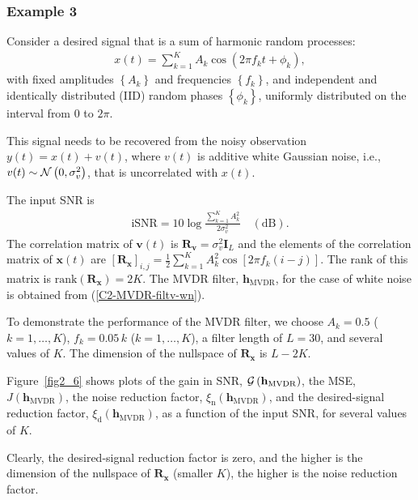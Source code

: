 \documentclass[10pt,pdflatex,headrule,landscape]{beamer}
\begin{document}
\begin{frame}
    \frametitle{Example 3}
Consider a desired signal that is a sum of harmonic random processes:
\begin{eqnarray*}
x(t) = \sum_{k=1}^K A_k \cos\left( 2\pi f_k t+\phi_k \right) ,
\end{eqnarray*}
with fixed amplitudes $\left\{A_k\right\}$ and frequencies $\left\{f_k\right\}$, and independent and identically distributed (IID) random phases $\left\{\phi_k\right\}$, uniformly distributed on the interval from $0$ to $2\pi$.

This signal needs to be recovered from the noisy observation $y(t)=x(t)+v(t)$, where $v(t)$ is additive white Gaussian noise, i.e., $v(t)\sim {\cal N}\left(0,\sigma_v^2\right)$, that is uncorrelated with $x(t)$.

\end{frame}
\begin{frame}[allowframebreaks]

The input SNR is
\begin{eqnarray*}
\mathrm{iSNR} = 10\log\frac{\sum_{k=1}^K A_k^2}{2 \sigma_v^2} \quad \mathrm{(dB)} .
\end{eqnarray*}
The correlation matrix of $\mathbf{v}(t)$ is $\mathbf{R}_{\mathbf{v}}=\sigma_v^2\mathbf{I}_L$ and the elements of the correlation matrix of $\mathbf{x}(t)$ are $\left[\mathbf{R}_{\mathbf{x}}\right]_{i,j}=\frac{1}{2}\sum_{k=1}^K {A_k^2\cos\left[2\pi f_k(i-j)\right]}$. The rank of this matrix is $\mathrm{rank}\left(\mathbf{R}_{\mathbf{x}}\right)=2 K$. The MVDR filter, $\mathbf{h}_{\mathrm{MVDR}}$, for the case of white noise is obtained from (\ref{C2-MVDR-filtv-wn}).

To demonstrate the performance of the MVDR filter, we choose $A_k=0.5$ ($k=1,\ldots,K$), $f_k=0.05\,k$  ($k=1,\ldots,K$), a filter length of $L=30$, and several values of $K$.
The dimension of the nullspace of $\mathbf{R}_{\mathbf{x}}$ is $L-2K$.

\end{frame}
\begin{frame}[allowframebreaks]

Figure~\ref{fig2_6} shows plots of the gain in SNR, ${\cal G}\left(\mathbf{h}_{\mathrm{MVDR}}\right)$, the MSE, $J\left(\mathbf{h}_{\mathrm{MVDR}}\right)$, the noise reduction factor, $\xi_{\mathrm{n}}\left( \mathbf{h}_{\mathrm{MVDR}} \right)$, and the desired-signal reduction factor, $\xi_{\mathrm{d}}\left( \mathbf{h}_{\mathrm{MVDR}} \right)$, as a function of the input SNR, for several values of $K$.

Clearly, the desired-signal reduction factor is zero, and the higher is the dimension of the nullspace of $\mathbf{R}_{\mathbf{x}}$ (smaller $K$), the higher is the noise reduction factor.

\end{frame}
\end{document}
